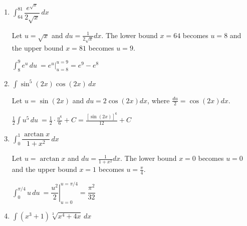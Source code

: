\documentclass{article}
\begin{document}
\begin{enumerate}
\begin{solution}
    Let $u=x+3$, where $u-3=x$, and $du=dx$. 
\newline
\newline
    $\displaystyle \int \dfrac{(u-3)^2}{u}\,du\ = \displaystyle \int \dfrac{u^2-6u+9}{u}\,du\ = \displaystyle \int 
    \left(u-6+\frac{9}{u}\right)\,du\ = \dfrac{u^2}{2}-6u+9\ln|u|+C $ \newline 
    \newline
    \newline
    $=\frac{1}{2}(x+3)^2-6(x+3)+9\ln|x+3|+C$
\end{solution}

\pspace{\vfill}
\pspace{\newpage}
\item $\displaystyle \int_{64}^{81} \dfrac{e^{\sqrt{x}}}{2\sqrt{x}}\,dx\ $

\begin{solution}
Let $u=\sqrt{x}$ and $du=\frac{1}{2\sqrt{x}}dx$. The lower bound $x=64$ becomes $u=8$ and the upper bound $x=81$ becomes $u=9$.

$\displaystyle \int_{8}^{9} e^u \,du\ = \left. e^u \right|_{u=8}^{u=9} = e^9-e^8$

\end{solution}

\pspace{\vfill}

\item $\displaystyle \int \sin^5 (2x) \cos (2x)\,dx\ $

\begin{solution}
    Let $u=\sin(2x)$ and $du=2\cos(2x)dx$, where $\frac{du}{2}=\cos(2x)dx$. 

$\displaystyle \frac{1}{2} \int u^5 \,du\ = \frac{1}{2} \cdot \frac{u^6}{6}+C= \frac{[\sin(2x)]^6}{12}+C$
    
\end{solution}
\pspace{\vfill}

\item $\displaystyle \int_{0}^{1} \dfrac{\arctan x}{1+x^2}\,dx\ $

\begin{solution}
    Let $u=\arctan x$ and $du=\frac{1}{1+x^2}dx$. The lower bound $x=0$ becomes $u=0$ and the upper bound $x=1$ becomes $u=\frac{\pi}{4}$.

    $\displaystyle \int_{0}^{\pi/4} u\,du\ = \left. \dfrac{u^2}{2} \right|_{u=0}^{u=\pi/4}=\dfrac{\pi^2}{32}$
\end{solution}
\pspace{\vfill}

\item $\displaystyle \int (x^3+1)\sqrt[3]{x^4+4x}\,dx\ $


\end{enumerate}
\end{document}
